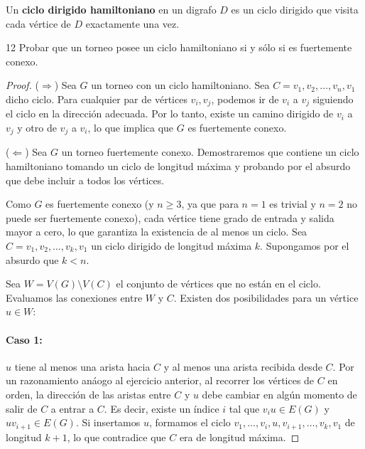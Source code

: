 \vspace{0.5cm}

\begin{definition}
	Un \textbf{ciclo dirigido hamiltoniano} en un digrafo \( D \) es un ciclo dirigido que visita cada vértice de \( D \) exactamente una vez.
\end{definition}

\begin{ejercicio}{12}
	Probar que un torneo posee un ciclo hamiltoniano si y sólo si es fuertemente conexo.
\end{ejercicio}
\begin{proof}
	(\(\Longrightarrow\)) Sea \( G \) un torneo con un ciclo hamiltoniano. Sea \( C = v_1, v_2, \ldots, v_n, v_1 \) dicho ciclo. Para cualquier par de vértices \( v_i, v_j \), podemos ir de \( v_i \) a \( v_j \) siguiendo el ciclo en la dirección adecuada. Por lo tanto, existe un camino dirigido de \( v_i \) a \( v_j \) y otro de \( v_j \) a \( v_i \), lo que implica que \( G \) es fuertemente conexo.

	(\(\Longleftarrow\)) Sea \( G \) un torneo fuertemente conexo. Demostraremos que contiene un ciclo hamiltoniano tomando un ciclo de longitud máxima y probando por el absurdo que debe incluir a todos los vértices.

	Como \( G \) es fuertemente conexo (y \( n \ge 3 \), ya que para \( n=1 \) es trivial y \( n=2 \) no puede ser fuertemente conexo), cada vértice tiene grado de entrada y salida mayor a cero, lo que garantiza la existencia de al menos un ciclo.
	Sea \( C = v_1, v_2, \ldots, v_k, v_1 \) un ciclo dirigido de longitud máxima \( k \). Supongamos por el absurdo que \( k < n \).

	Sea \( W = V(G) \setminus V( C ) \) el conjunto de vértices que no están en el ciclo. Evaluamos las conexiones entre \( W \) y \( C \). Existen dos posibilidades para un vértice \( u \in W \):

	\paragraph{Caso 1:} \( u \) tiene al menos una arista hacia \( C \) y al menos una arista recibida desde \( C \).
	Por un razonamiento anáogo al ejercicio anterior, al recorrer los vértices de \( C \) en orden, la dirección de las aristas entre \( C \) y \( u \) debe cambiar en algún momento de salir de \( C \) a entrar a \( C \). Es decir, existe un índice \( i \) tal que \( v_i u \in E(G) \) y \( u v_{i+1} \in E(G) \).
	Si insertamos \( u \), formamos el ciclo \( v_1, \ldots, v_i, u, v_{i+1}, \ldots, v_k, v_1 \) de longitud \( k+1 \), lo que contradice que \( C \) era de longitud máxima.


\end{proof}
